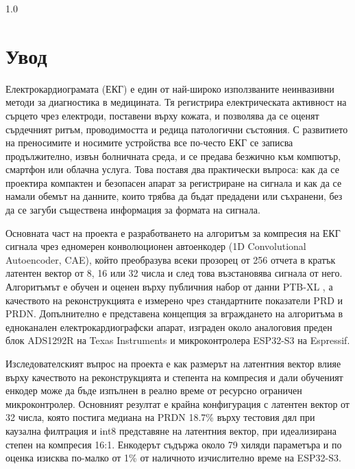 \documentclass[12pt,a4paper]{article}
\begin{document}

\begin{spacing}{1.0}
\tableofcontents
\end{spacing}
\newpage

\section{Увод}
Електрокардиограмата (ЕКГ) е един от най-широко използваните неинвазивни методи за диагностика в медицината. Тя регистрира електрическата активност на сърцето чрез електроди, поставени върху кожата, и позволява да се оценят сърдечният ритъм, проводимостта и редица патологични състояния. С развитието на преносимите и носимите устройства все по-често ЕКГ се записва продължително, извън болничната среда, и се предава безжично към компютър, смартфон или облачна услуга. Това поставя два практически въпроса: как да се проектира компактен и безопасен апарат за регистриране на сигнала и как да се намали обемът на данните, които трябва да бъдат предадени или съхранени, без да се загуби съществена информация за формата на сигнала.

Основната част на проекта е разработването на алгоритъм за компресия на ЕКГ сигнала чрез едномерен конволюционен автоенкодер (1D Convolutional Autoencoder, CAE), който преобразува всеки прозорец от 256 отчета в кратък латентен вектор от 8, 16 или 32 числа и след това възстановява сигнала от него. Алгоритъмът е обучен и оценен върху публичния набор от данни PTB-XL \cite{wagner2020ptbxl,wagner2022ptbxlphysionet}, а качеството на реконструкцията е измерено чрез стандартните показатели PRD и PRDN. Допълнително е представена концепция за вграждането на алгоритъма в едноканален електрокардиографски апарат, изграден около аналоговия преден блок ADS1292R на Texas Instruments и микроконтролера ESP32-S3 на Espressif.

Изследователският въпрос на проекта е как размерът на латентния вектор влияе върху качеството на реконструкцията и степента на компресия и дали обученият енкодер може да бъде изпълнен в реално време от ресурсно ограничен микроконтролер. Основният резултат е крайна конфигурация с латентен вектор от 32 числа, която постига медиана на PRDN 18.7\% върху тестовия дял при каузална филтрация и int8 представяне на латентния вектор, при идеализирана степен на компресия 16:1. Енкодерът съдържа около 79 хиляди параметъра и по оценка изисква по-малко от 1\% от наличното изчислително време на ESP32-S3.
\end{document}
